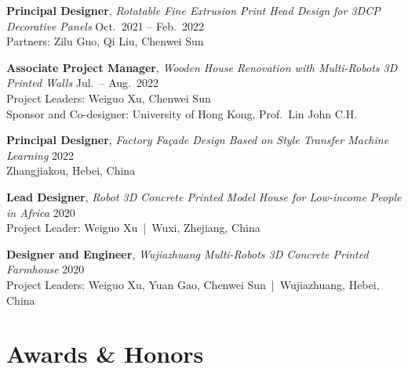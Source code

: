 \documentclass[11pt,a4paper]{article}
\newcommand{\entrytitle}[1]{\textbf{#1}}
\newcommand{\entrydetail}[1]{\textit{#1}}
\begin{document}
\entrytitle{Principal Designer}, \entrydetail{Rotatable Fine Extrusion Print Head Design for 3DCP Decorative Panels} \hfill Oct.\ 2021 -- Feb.\ 2022 \\
Partners: Zilu Guo, Qi Liu, Chenwei Sun

\entrytitle{Associate Project Manager}, \entrydetail{Wooden House Renovation with Multi-Robots 3D Printed Walls} \hfill Jul.\ -- Aug.\ 2022 \\
Project Leaders: Weiguo Xu, Chenwei Sun \\
Sponsor and Co-designer: University of Hong Kong, Prof.\ Lin John C.H.

\entrytitle{Principal Designer}, \entrydetail{Factory Fa\c{c}ade Design Based on Style Transfer Machine Learning} \hfill 2022 \\
Zhangjiakou, Hebei, China

\entrytitle{Lead Designer}, \entrydetail{Robot 3D Concrete Printed Model House for Low-income People in Africa} \hfill 2020 \\
Project Leader: Weiguo Xu \,|\, Wuxi, Zhejiang, China

\entrytitle{Designer and Engineer}, \entrydetail{Wujiazhuang Multi-Robots 3D Concrete Printed Farmhouse} \hfill 2020 \\
Project Leaders: Weiguo Xu, Yuan Gao, Chenwei Sun \,|\, Wujiazhuang, Hebei, China

\section{Awards \& Honors}
\end{document}
